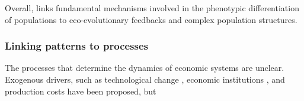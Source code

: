 Overall, \chapi links fundamental mechanisms involved in the phenotypic differentiation of populations to eco-evolutionary feedbacks and complex population structures. %

\subsubsection{Linking patterns to processes}

The processes that determine the dynamics of economic systems are unclear. 
% 
Exogenous drivers, such as technological change \cite{XXX}, economic institutions \cite{XXX}, and production costs \cite{Boschma2005a} have been proposed, but 






























